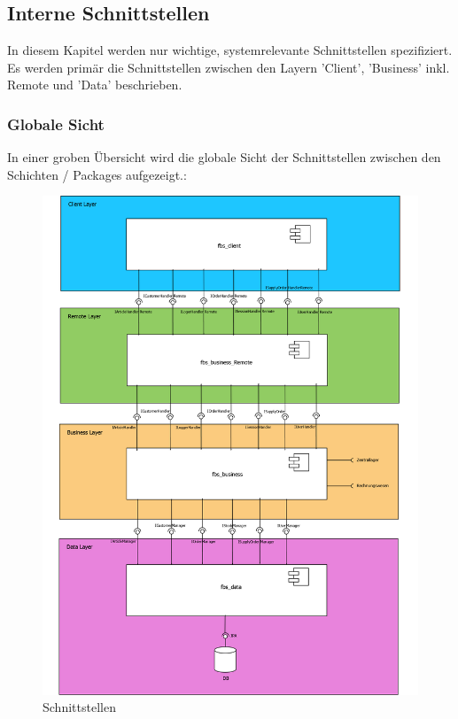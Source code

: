 \subsection{Interne Schnittstellen}
In diesem Kapitel werden nur wichtige, systemrelevante Schnittstellen spezifiziert. Es werden primär die Schnittstellen zwischen den Layern 'Client', 'Business' inkl. Remote und 'Data' beschrieben.




\subsubsection{Globale Sicht}
In einer groben Übersicht wird die globale Sicht der Schnittstellen zwischen den Schichten / Packages aufgezeigt.:\\
\begin{figure}[H]
\centering
	\includegraphics[width=1.0\linewidth]{Images/Schnittstellen}
	\caption{Schnittstellen}
	\label{fig:schnittstellen}
\end{figure}

